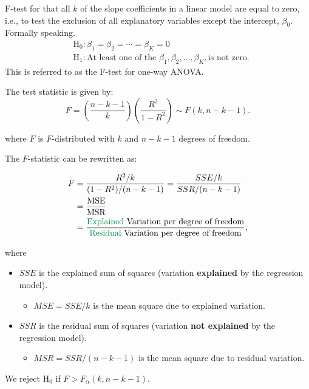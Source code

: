\documentclass[
  12pt,
  a4paper,
]{scrbook}
\providecommand{\tightlist}{%
  \setlength{\itemsep}{0pt}\setlength{\parskip}{0pt}}
\newcommand{\green}[1]{\textcolor[RGB]{0, 139, 69}{#1}}
\renewcommand{\tightlist}{\setlength{\itemsep}{0.5\baselineskip}\setlength{\parskip}{0.2\baselineskip}}
\theoremstyle{plain}
\theoremstyle{definition}
\theoremstyle{remark}
\begin{document}
F-test for that all \(k\) of the slope coefficients in a linear model
are equal to zero, i.e., to test the exclusion of all explanatory
variables {except the intercept}, \(\beta_0\). Formally speaking. \[
\begin{aligned}
&\text{H}_0: \beta_1 = \beta_2 = \cdots = \beta_K=0 \\
&\text{H}_1: \text{At least one of the } \beta_1, \beta_2,\ldots, \beta_K,\text{is not zero.}
\end{aligned}
\] This is referred to as the {F-test} for {one-way ANOVA}.

The test statistic is given by: \[
F = \left(\frac{n-k-1}{k}\right) \left(\frac{R^2}{1-R^2}\right) \sim F(k, n-k-1) .
\]

where \(F\) is \(F\)-distributed with \(k\) and \(n-k-1\) degrees of
freedom.

The \(F\)-statistic can be rewritten as:

\[
\begin{split}
F &= \frac{R^2/k}{(1-R^2)/(n-k-1)} = \frac{SSE/k}{SSR/(n-k-1)} \\
&= \frac{\text{MSE}}{\text{MSR}} \\
& = \frac{\text{\green{Explained} Variation per degree of freedom}}{\text{\green{Residual} Variation per degree of freedom}} ,
\end{split}
\]

where

\begin{itemize}
\tightlist
\item
  \(SSE\) is the explained sum of squares (variation \textbf{explained}
  by the regression model).

  \begin{itemize}
  \tightlist
  \item
    \(MSE = SSE/k\) is the mean square due to explained variation.
  \end{itemize}
\item
  \(SSR\) is the residual sum of squares (variation \textbf{not
  explained} by the regression model).

  \begin{itemize}
  \tightlist
  \item
    \(MSR = SSR/(n-k-1)\) is the mean square due to residual variation.
  \end{itemize}
\end{itemize}

We reject \(\text{H}_0\) if \(F>F_{\alpha}(k, n-k-1)\).
\end{document}
